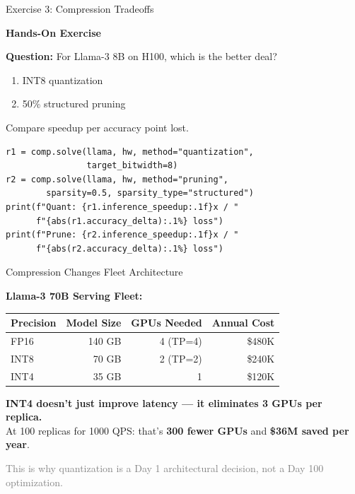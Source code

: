 \documentclass[aspectratio=169, 12pt]{beamer}
\begin{document}
\begin{frame}[fragile]{Exercise 3: Compression Tradeoffs}

\centering
\Large\bfseries
Hands-On Exercise\\[0.5cm]
\normalsize

\textbf{Question:} For Llama-3 8B on H100, which is the better deal?
\begin{enumerate}
  \item INT8 quantization
  \item 50\% structured pruning
\end{enumerate}
Compare speedup per accuracy point lost.

\vspace{0.3cm}
\begin{lstlisting}
r1 = comp.solve(llama, hw, method="quantization",
                target_bitwidth=8)
r2 = comp.solve(llama, hw, method="pruning",
        sparsity=0.5, sparsity_type="structured")
print(f"Quant: {r1.inference_speedup:.1f}x / "
      f"{abs(r1.accuracy_delta):.1%} loss")
print(f"Prune: {r2.inference_speedup:.1f}x / "
      f"{abs(r2.accuracy_delta):.1%} loss")
\end{lstlisting}
\end{frame}

\begin{frame}{Compression Changes Fleet Architecture}

\small
\textbf{Llama-3 70B Serving Fleet:}

\vspace{0.3cm}
\begin{tabular}{@{}lrrr@{}}
\toprule
Precision & Model Size & GPUs Needed & Annual Cost \\
\midrule
FP16 & 140 GB & 4 (TP=4) & \$480K \\
INT8 & 70 GB & 2 (TP=2) & \$240K \\
INT4 & 35 GB & 1 & \$120K \\
\bottomrule
\end{tabular}

\vspace{0.3cm}
\textbf{INT4 doesn't just improve latency --- it eliminates 3 GPUs per replica.}\\
At 100 replicas for 1000 QPS: that's \textbf{300 fewer GPUs} and \textbf{\$36M saved per year}.

\vfill
\centering
\small\textcolor{gray}{This is why quantization is a Day 1 architectural decision, not a Day 100 optimization.}
\end{frame}
\end{document}
